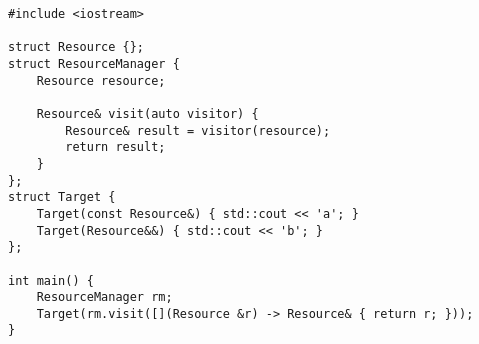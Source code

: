 \begin{lstlisting}[title=\href{https://godbolt.org/z/_PtVRL}{\texttt{godbolt.org/z/\_PtVRL}}]
#include <iostream>

struct Resource {};
struct ResourceManager {
    Resource resource;

    Resource& visit(auto visitor) {
        Resource& result = visitor(resource);
        return result;
    }
};
struct Target {
    Target(const Resource&) { std::cout << 'a'; } 
    Target(Resource&&) { std::cout << 'b'; }
};

int main() {
    ResourceManager rm;
    Target(rm.visit([](Resource &r) -> Resource& { return r; }));
}
\end{lstlisting}
